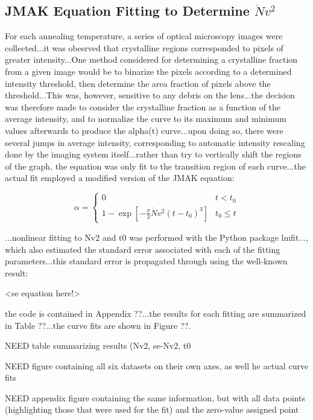 \subsection{JMAK Equation Fitting to Determine $\dot{N}v^2$}

For each annealing temperature, a series of optical microscopy images were collected...it was obesrved that crystalline regions corresponded to pixels of greater intensity...One method considered for determining a crystalline fraction from a given image would be to binarize the pixels according to a determined intensity threshold, then determine the area fraction of pixels above the threshold...This was, however, sensitive to any debris on the lens...the decision was therefore made to consider the crystalline fraction as a function of the average intensity, and to normalize the curve to its maximum and minimum values afterwards to produce the alpha(t) curve...upon doing so, there were several jumps in average intensity, corresponding to automatic intensity rescaling done by the imaging system itself...rather than try to vertically shift the regions of the graph, the equation was only fit to the transition region of each curve...the actual fit employed a modified version of the JMAK equation:

\begin{equation}
\alpha =
\begin{cases}
	0 & t < t_0 \\
	1 - \exp \left[ -\frac{\pi}{3} \dot{N} v^2 (t-t_0)^3 \right] & t_0 \leq t
\end{cases}
\end{equation}

...nonlinear fitting to Nv2 and t0 was performed with the Python package lmfit..., which also estimated the standard error associated with each of the fitting parameters...this standard error is propagated through using the well-known result:

<se equation here!>

the code is contained in Appendix ??...the results for each fitting are summarized in Table ??...the curve fits are shown in Figure ??.

NEED table summarizing results (Nv2, se-Nv2, t0

NEED figure containing all six datasets on their own axes, as well he actual curve fits

NEED appendix figure containing the same information, but with all data points (highlighting those that were used for the fit) and the zero-value assigned point

